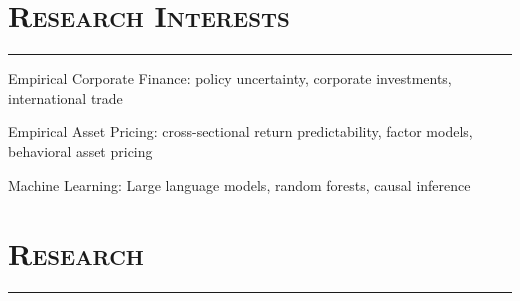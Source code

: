 \documentclass[10pt,letterpaper]{article}
\renewenvironment{itemize}{
  \begin{list}{}{
    \setlength{\leftmargin}{1.5em}
    \setlength{\itemsep}{0.25em}
    \setlength{\parskip}{0pt}
    \setlength{\parsep}{0.25em}
  }
}{
  \end{list}
}
\begin{document}
\section*{\textsc{Research Interests}}
\nointerlineskip
\vspace{-3mm}
\rule{\textwidth}{0.5mm}

\begin{itemize}
  \item Empirical Corporate Finance: policy uncertainty, corporate investments, international trade
  \item Empirical Asset Pricing: cross-sectional return predictability, factor models, behavioral asset pricing
  \item Machine Learning: Large language models, random forests, causal inference
\end{itemize}












\section*{\textsc{Research}}
\nointerlineskip
\vspace{-3mm}
\rule{\textwidth}{0.5mm}
\end{document}
